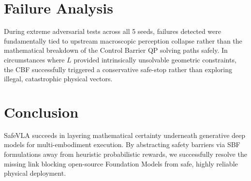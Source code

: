 \documentclass[conference]{IEEEtran}
\begin{document}
\section{Failure Analysis}
During extreme adversarial tests across all 5 seeds, failures detected were fundamentally tied to upstream macroscopic perception collapse rather than the mathematical breakdown of the Control Barrier QP solving paths safely. In circumstances where $L$ provided intrinsically unsolvable geometric constraints, the CBF successfully triggered a conservative safe-stop rather than exploring illegal, catastrophic physical vectors.

\section{Conclusion}
SafeVLA succeeds in layering mathematical certainty underneath generative deep models for multi-embodiment execution. By abstracting safety barriers via SBF formulations away from heuristic probabilistic rewards, we successfully resolve the missing link blocking open-source Foundation Models from safe, highly reliable physical deployment.

\balance

\end{document}
